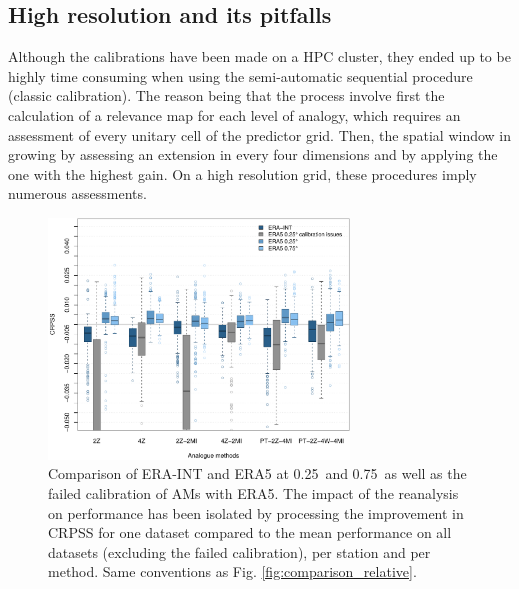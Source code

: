 \documentclass[alpha-refs]{wiley-article}
\begin{document}
\subsection{High resolution and its pitfalls}
\label{sec:results_hires}

Although the calibrations have been made on a HPC cluster, they ended up to be highly time consuming when using the semi-automatic sequential procedure (classic calibration). The reason being that the process involve first the calculation of a relevance map for each level of analogy, which requires an assessment of every unitary cell of the predictor grid. Then, the spatial window in growing by assessing an extension in every four dimensions and by applying the one with the highest gain. On a high resolution grid, these procedures imply numerous assessments.

\begin{figure}[bt]
	\centering
	\includegraphics[width=80mm]{figures/boxplot-resol-diff.pdf}
	\caption{Comparison of ERA-INT and ERA5 at 0.25\degree\ and 0.75\degree\ as well as the failed calibration of AMs with ERA5. The impact of the reanalysis on performance has been isolated by processing the improvement in CRPSS for one dataset compared to the mean performance on all datasets (excluding the failed calibration), per station and per method. Same conventions as Fig. \ref{fig:comparison_relative}.}
	\label{fig:resolution}
\end{figure}
\end{document}
